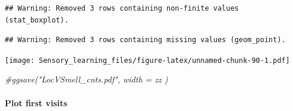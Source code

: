 \documentclass[]{article}
\newenvironment{Shaded}{\begin{snugshade}}{\end{snugshade}}
\newcommand{\CommentTok}[1]{\textcolor[rgb]{0.56,0.35,0.01}{\textit{{#1}}}}
\let\oldparagraph\paragraph
\renewcommand{\paragraph}[1]{\oldparagraph{#1}\mbox{}}
\begin{document}
\begin{verbatim}
## Warning: Removed 3 rows containing non-finite values (stat_boxplot).
\end{verbatim}

\begin{verbatim}
## Warning: Removed 3 rows containing missing values (geom_point).
\end{verbatim}

\texttt{[image: Sensory\_learning\_files/figure-latex/unnamed-chunk-90-1.pdf]}

\begin{Shaded}
\begin{Highlighting}[]
\CommentTok{#ggsave("LocVSmell_cnts.pdf", width = zz  )}
\end{Highlighting}
\end{Shaded}

\paragraph{Plot first visits}\label{plot-first-visits-4}
\end{document}
